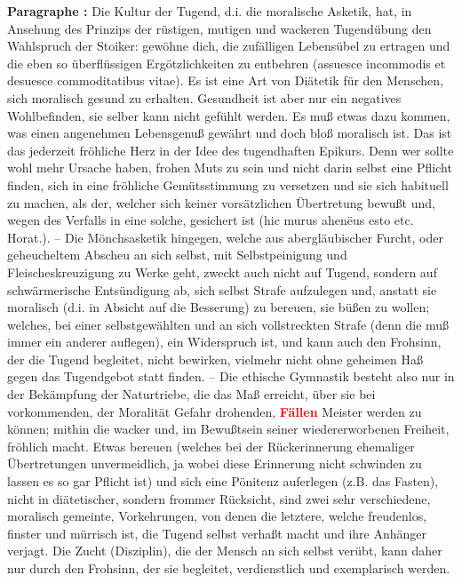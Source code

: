 \documentclass[a4paper,12pt,twoside]{book}
\newcommand{\match}[1]{\textcolor{red}{\textbf{#1}}}
\begin{document}
	\textbf{Paragraphe : }Die Kultur der Tugend, d.i. die moralische Asketik, hat, in Ansehung des Prinzips der rüstigen, mutigen und wackeren Tugendübung den Wahlspruch der Stoiker: gewöhne dich, die zufälligen Lebensübel zu ertragen und die eben so überflüssigen Ergötzlichkeiten zu entbehren (assuesce incommodis et desuesce commoditatibus vitae). Es ist eine Art von Diätetik für den Menschen, sich moralisch gesund zu erhalten. Gesundheit ist aber nur ein negatives  Wohlbefinden, sie selber kann nicht gefühlt werden. Es muß etwas dazu kommen, was einen angenehmen Lebensgenuß gewährt und doch bloß moralisch ist. Das ist das jederzeit fröhliche Herz in der Idee des tugendhaften Epikurs. Denn wer sollte wohl mehr Ursache haben, frohen Muts zu sein und nicht darin selbst eine Pflicht finden, sich in eine fröhliche Gemütsstimmung zu versetzen und sie sich habituell zu machen, als der, welcher sich keiner vorsätzlichen Übertretung bewußt und, wegen des Verfalls in eine solche, gesichert ist (hic murus ahenëus esto etc. Horat.). – Die Mönchsasketik hingegen, welche aus abergläubischer Furcht, oder geheucheltem Abscheu an sich selbst, mit Selbstpeinigung und Fleischeskreuzigung zu Werke geht, zweckt auch nicht auf Tugend, sondern auf schwärmerische Entsündigung ab, sich selbst Strafe aufzulegen und, anstatt sie moralisch (d.i. in Absicht auf die Besserung) zu bereuen, sie büßen zu wollen; welches, bei einer selbstgewählten und an sich vollstreckten Strafe (denn die muß immer ein anderer auflegen), ein Widerspruch ist, und kann auch den Frohsinn, der die Tugend begleitet, nicht bewirken, vielmehr nicht ohne geheimen Haß gegen das Tugendgebot statt finden. – Die ethische Gymnastik besteht also nur in der Bekämpfung der Naturtriebe, die das Maß erreicht, über sie bei vorkommenden, der Moralität Gefahr drohenden, \match{Fällen} Meister werden zu können; mithin die wacker und, im Bewußtsein seiner wiedererworbenen Freiheit, fröhlich macht. Etwas bereuen (welches bei der Rückerinnerung ehemaliger Übertretungen unvermeidlich, ja wobei diese Erinnerung nicht schwinden zu lassen es so gar Pflicht ist) und sich eine Pönitenz auferlegen (z.B. das Fasten), nicht in diätetischer, sondern frommer Rücksicht, sind zwei sehr verschiedene, moralisch gemeinte, Vorkehrungen, von denen die letztere, welche freudenlos, finster und mürrisch ist, die Tugend selbst verhaßt macht und ihre Anhänger verjagt. Die Zucht (Disziplin), die der Mensch an sich selbst verübt, kann daher nur durch den Frohsinn, der sie begleitet, verdienstlich und exemplarisch werden. 
	
\end{document}
